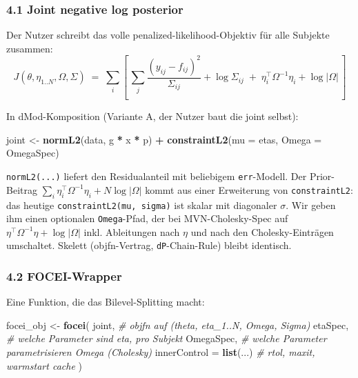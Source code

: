 \documentclass[
]{article}
\newenvironment{Shaded}{\begin{snugshade}}{\end{snugshade}}
\newcommand{\AttributeTok}[1]{\textcolor[rgb]{0.13,0.29,0.53}{#1}}
\newcommand{\CommentTok}[1]{\textcolor[rgb]{0.56,0.35,0.01}{\textit{#1}}}
\newcommand{\FunctionTok}[1]{\textcolor[rgb]{0.13,0.29,0.53}{\textbf{#1}}}
\newcommand{\NormalTok}[1]{#1}
\newcommand{\OtherTok}[1]{\textcolor[rgb]{0.56,0.35,0.01}{#1}}
\newcommand{\SpecialCharTok}[1]{\textcolor[rgb]{0.81,0.36,0.00}{\textbf{#1}}}
\begin{document}
\subsubsection{4.1 Joint negative log
posterior}\label{joint-negative-log-posterior}

Der Nutzer schreibt das volle penalized-likelihood-Objektiv für alle
Subjekte zusammen: \[
J(\theta, \eta_{1..N}, \Omega, \Sigma)
\;=\; \sum_i \!\left[\, \sum_j \frac{(y_{ij} - f_{ij})^2}{\Sigma_{ij}} + \log\Sigma_{ij}
\;+\; \eta_i^\top \Omega^{-1} \eta_i + \log|\Omega| \,\right]
\]

In dMod-Komposition (Variante A, der Nutzer baut die joint selbst):

\begin{Shaded}
\begin{Highlighting}[]
\NormalTok{joint }\OtherTok{\textless{}{-}} \FunctionTok{normL2}\NormalTok{(data, g }\SpecialCharTok{*}\NormalTok{ x }\SpecialCharTok{*}\NormalTok{ p) }\SpecialCharTok{+} \FunctionTok{constraintL2}\NormalTok{(}\AttributeTok{mu =}\NormalTok{ etas, }\AttributeTok{Omega =}\NormalTok{ OmegaSpec)}
\end{Highlighting}
\end{Shaded}

\texttt{normL2(...)} liefert den Residualanteil mit beliebigem
\texttt{err}-Modell. Der Prior-Beitrag
\(\sum_i \eta_i^\top \Omega^{-1} \eta_i + N\log|\Omega|\) kommt aus
einer Erweiterung von \texttt{constraintL2}: das heutige
\texttt{constraintL2(mu,\ sigma)} ist skalar mit diagonaler \(\sigma\).
Wir geben ihm einen optionalen \texttt{Omega}-Pfad, der bei
MVN-Cholesky-Spec auf \(\eta^\top\Omega^{-1}\eta + \log|\Omega|\) inkl.
Ableitungen nach \(\eta\) und nach den Cholesky-Einträgen umschaltet.
Skelett (objfn-Vertrag, \texttt{dP}-Chain-Rule) bleibt identisch.

\subsubsection{4.2 FOCEI-Wrapper}\label{focei-wrapper}

Eine Funktion, die das Bilevel-Splitting macht:

\begin{Shaded}
\begin{Highlighting}[]
\NormalTok{focei\_obj }\OtherTok{\textless{}{-}} \FunctionTok{focei}\NormalTok{(}
\NormalTok{  joint,                     }\CommentTok{\# objfn auf (theta, eta\_1..N, Omega, Sigma)}
\NormalTok{  etaSpec,                   }\CommentTok{\# welche Parameter sind eta, pro Subjekt}
\NormalTok{  OmegaSpec,                 }\CommentTok{\# welche Parameter parametrisieren Omega (Cholesky)}
  \AttributeTok{innerControl =} \FunctionTok{list}\NormalTok{(...)   }\CommentTok{\# rtol, maxit, warmstart cache}
\NormalTok{)}
\end{Highlighting}
\end{Shaded}
\end{document}
